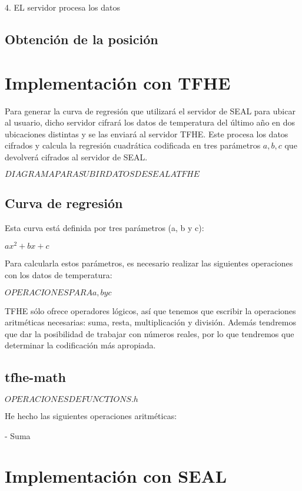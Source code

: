 4. EL servidor procesa los datos

\subsection{Obtención de la posición}


\section{Implementación con TFHE}

Para generar la curva de regresión que utilizará el servidor de SEAL para ubicar al usuario, dicho servidor cifrará los datos de temperatura del último año en dos ubicaciones distintas y se las enviará al servidor TFHE. Este procesa los datos cifrados y calcula la regresión cuadrática codificada en tres parámetros $a, b, c$ que devolverá cifrados al servidor de SEAL.

$ DIAGRAMA PARA SUBIR DATOS DE SEAL A TFHE$

\subsection{Curva de regresión}

Esta curva está definida por tres parámetros (a, b y c):

$ ax^2 + bx + c $

Para calcularla estos parámetros, es necesario realizar las siguientes operaciones con los datos de temperatura:

$ OPERACIONES PARA a, b y c $

TFHE sólo ofrece operadores lógicos, así que tenemos que escribir la operaciones aritméticas necesarias: suma, resta, multiplicación y división. Además tendremos que dar la posibilidad de trabajar con números reales, por lo que tendremos que determinar la codificación más apropiada.

\subsection{tfhe-math}

$ OPERACIONES DE FUNCTIONS.h $

He hecho las siguientes operaciones aritméticas:

- Suma


\section{Implementación con SEAL}
